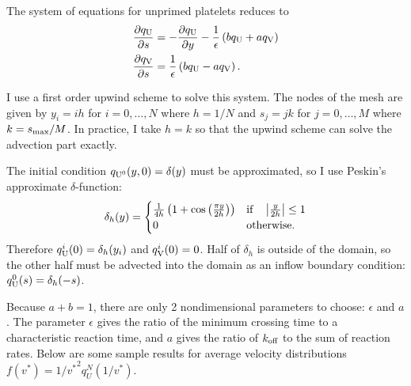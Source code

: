 \documentclass{article}
\newcommand{\tn}{\textnormal}
\newcommand{\dd}{d}
\newcommand{\Der}[2]{\frac{\dd #1}{\dd #2}}
\newcommand{\Pder}[2]{\frac{\partial #1}{\partial #2}}
\begin{document}
The system of equations for unprimed platelets reduces to
\begin{align}
  \label{eq:unprimed-1}
  \Pder{q_\tn{U}}{s} &= -\Pder{q_\tn{U}}{y} - \frac{1}{\epsilon}
                       \left(b q_\tn{U} + a q_\tn{V}\right) \\
  \label{eq:unprimed-2}
  \Pder{q_\tn{V}}{s} &= \frac{1}{\epsilon} \left(b q_\tn{U} - a
                       q_\tn{V}\right).
\end{align}

I use a first order upwind scheme to solve this system. The nodes of
the mesh are given by $y_i = ih$ for $i = 0, \hdots, N$ where
$h = 1/N$ and $s_j = jk$ for $j = 0, \hdots, M$ where $k =
s_\tn{max}/M$. In practice, I take $h = k$ so that the upwind scheme
can solve the advection part exactly.

The initial condition $q_{\tn{U}^0}(y, 0) = \delta(y)$ must be
approximated, so I use Peskin's approximate $\delta$-function:
\begin{equation}
  \label{eq:delta-h}
  \delta_h(y) =
  \begin{cases}
    \frac{1}{4h} \left( 1 + \cos\left(\frac{\pi y}{2h}\right) \right)
    & \tn{if} \quad \left|\frac{y}{2h}\right| \le 1 \\
    0 & \tn{otherwise.}
  \end{cases}
\end{equation}
Therefore $q_\tn{U}^i(0) = \delta_h(y_i)$ and $q_\tn{V}^i(0) =
0$. Half of $\delta_h$ is outside of the domain, so the other half
must be advected into the domain as an inflow boundary condition:
$q_\tn{U}^0(s) = \delta_h(-s)$.

Because $a + b = 1$, there are only 2 nondimensional parameters to
choose: $\epsilon$ and $a$. The parameter $\epsilon$ gives the ratio
of the minimum crossing time to a characteristic reaction time, and
$a$ gives the ratio of $k_\tn{off}$ to the sum of reaction
rates. Below are some sample results for average velocity
distributions $f(v^*) = 1/{v^*}^2 q_U^N(1/v^*)$. 
\end{document}
